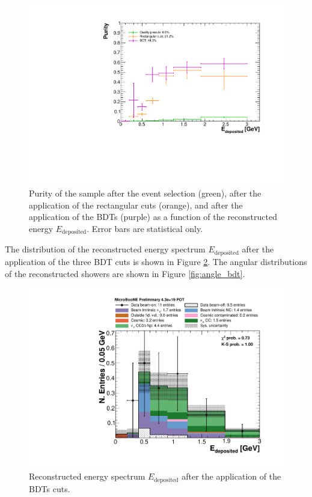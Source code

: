 \begin{figure}[htbp]
\centering
  \includegraphics[width=0.75\linewidth]{figures/purity_bdt.pdf}
  \caption{Purity of the sample after the event selection (green), after the application of the rectangular cuts (orange), and after the application of the BDTs (purple) as a function of the reconstructed energy $E_{\mathrm{deposited}}$. Error bars are statistical only.}\label{fig:purity_bdt}
\end{figure}

The distribution of the reconstructed energy spectrum $E_{\mathrm{deposited}}$ after the application of the three BDT cuts is shown in Figure \ref{fig:reco_bdt}. The angular distributions of the reconstructed showers are shown in Figure \ref{fig:angle_bdt}. 

\begin{figure}[htbp]
\centering
  \includegraphics[width=0.75\linewidth]{figures/h_reco_energy_bdt.pdf}
  \caption{Reconstructed energy spectrum $E_{\mathrm{deposited}}$ after the application of the BDTs cuts.}\label{fig:reco_bdt}
\end{figure}

